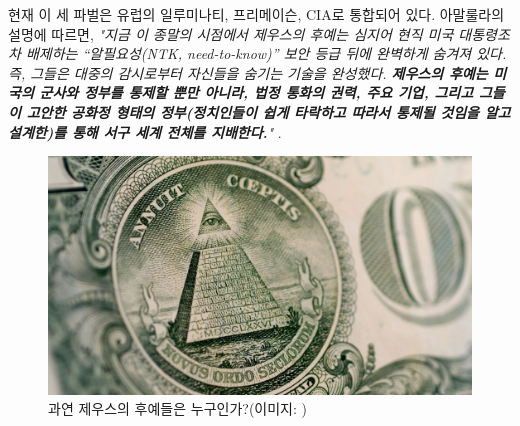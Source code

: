 \documentclass[10pt,twocolumn,letterpaper]{article}
\begin{document}
현재 이 세 파벌은 유럽의 일루미나티, 프리메이슨, CIA로 통합되어 있다. 아말룰라의 설명에 따르면, \textit{"지금 이 종말의 시점에서 제우스의 후예는 심지어 현직 미국 대통령조차 배제하는 “알필요성(NTK, need-to-know)” 보안 등급 뒤에 완벽하게 숨겨져 있다. 즉, 그들은 대중의 감시로부터 자신들을 숨기는 기술을 완성했다. \textbf{제우스의 후예는 미국의 군사와 정부를 통제할 뿐만 아니라, 법정 통화의 권력, 주요 기업, 그리고 그들이 고안한 공화정 형태의 정부(정치인들이 쉽게 타락하고 따라서 통제될 것임을 알고 설계한)를 통해 서구 세계 전체를 지배한다.}"} \cite{33,34}.

\begin{figure}[h]
\begin{center}
   \includegraphics[width=1\linewidth]{illuminati.jpg}

\end{center}
   \caption{과연 제우스의 후예들은 누구인가?(이미지: \cite{35})}
\label{fig:10}
\label{fig:onecol}
\end{figure}
\end{document}
